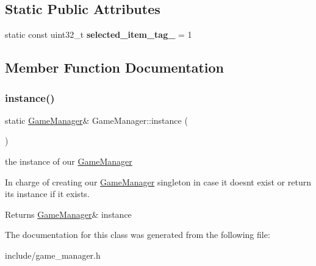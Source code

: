 \subsection*{Static Public Attributes}
\begin{DoxyCompactItemize}
\item 
\mbox{\label{class_game_manager_adce064d683ccffc7d98dca0f7a2b7b91}} 
static const uint32\+\_\+t {\bfseries selected\+\_\+item\+\_\+tag\+\_\+} = 1
\end{DoxyCompactItemize}


\subsection{Member Function Documentation}
\mbox{\label{class_game_manager_afa37ab23c040b5225d567d4c9ab854e1}} 
\subsubsection{\texorpdfstring{instance()}{instance()}}
{\footnotesize\ttfamily static \hyperlink{class_game_manager}{Game\+Manager}\& Game\+Manager\+::instance (\begin{DoxyParamCaption}{ }\end{DoxyParamCaption})\hspace{0.3cm}{\ttfamily [static]}}

the instance of our \hyperlink{class_game_manager}{Game\+Manager}

In charge of creating our \hyperlink{class_game_manager}{Game\+Manager} singleton in case it doesn\textquotesingle{}t exist or return it\textquotesingle{}s instance if it exists.

\begin{DoxyReturn}{Returns}
\hyperlink{class_game_manager}{Game\+Manager}\& instance 
\end{DoxyReturn}


The documentation for this class was generated from the following file\+:\begin{DoxyCompactItemize}
\item 
include/game\+\_\+manager.\+h\end{DoxyCompactItemize}
